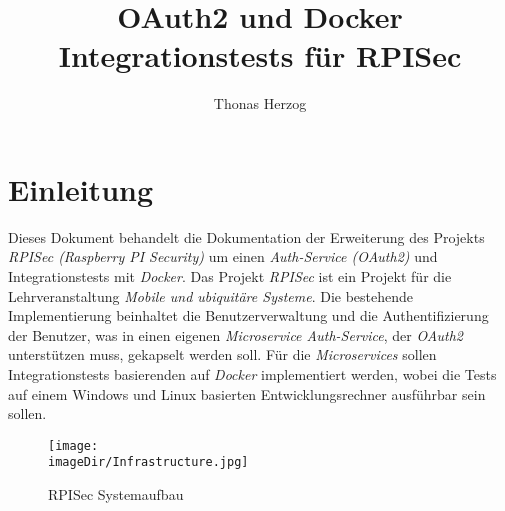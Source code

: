 \documentclass[]{article}
\title{OAuth2 und Docker Integrationstests für RPISec}
\author{Thonas Herzog}
\newcommand{\imageDir}{../../images}
\begin{document}
\maketitle

\section{Einleitung}
Dieses Dokument behandelt die Dokumentation der Erweiterung des Projekts \emph{RPISec (Raspberry PI Security)} um einen \emph{Auth-Service (OAuth2)} und Integrationstests mit \emph{Docker}. Das Projekt \emph{RPISec} ist ein Projekt für die Lehrveranstaltung \emph{Mobile und ubiquitäre Systeme}. 
\newline
\newline
Die bestehende Implementierung beinhaltet die Benutzerverwaltung und die Authentifizierung der Benutzer, was in einen eigenen \emph{Microservice Auth-Service}, der \emph{OAuth2} unterstützen muss, gekapselt werden soll. Für die \emph{Microservices} sollen Integrationstests basierenden auf \emph{Docker} implementiert werden, wobei die Tests auf einem Windows und Linux basierten Entwicklungsrechner ausführbar sein sollen. 
\begin{figure}[h]
	\centering
	\texttt{[image: \\imageDir/Infrastructure.jpg]}
	\caption{RPISec Systemaufbau}
	\label{fig:image-rpisec-system-structure}
\end{figure}
\ \newpage
\end{document}
